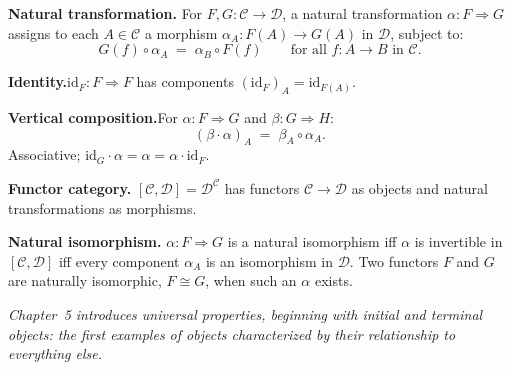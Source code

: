 \begin{formalrestatement}
\textbf{Natural transformation.}\quad
For $F, G : \mathcal{C} \to \mathcal{D}$, a natural transformation
$\alpha : F \Rightarrow G$ assigns to each $A \in \mathcal{C}$ a morphism
$\alpha_A : F(A) \to G(A)$ in $\mathcal{D}$, subject to:
\begin{equation*}
  G(f) \circ \alpha_A \;=\; \alpha_B \circ F(f)
  \qquad \text{for all } f : A \to B \text{ in } \mathcal{C}.
\end{equation*}

\medskip
\textbf{Identity.}\quad $\mathrm{id}_F : F \Rightarrow F$ has components
$(\mathrm{id}_F)_A = \mathrm{id}_{F(A)}$.

\medskip
\textbf{Vertical composition.}\quad For $\alpha : F \Rightarrow G$ and
$\beta : G \Rightarrow H$:
\begin{equation*}
  (\beta \cdot \alpha)_A \;=\; \beta_A \circ \alpha_A.
\end{equation*}
Associative; $\mathrm{id}_G \cdot \alpha = \alpha = \alpha \cdot \mathrm{id}_F$.

\medskip
\textbf{Functor category.}\quad
$[\mathcal{C}, \mathcal{D}] = \mathcal{D}^{\mathcal{C}}$ has functors
$\mathcal{C} \to \mathcal{D}$ as objects and natural transformations as
morphisms.

\medskip
\textbf{Natural isomorphism.}\quad
$\alpha : F \Rightarrow G$ is a natural isomorphism iff $\alpha$ is
invertible in $[\mathcal{C}, \mathcal{D}]$ iff every component $\alpha_A$
is an isomorphism in $\mathcal{D}$. Two functors $F$ and $G$ are naturally
isomorphic, $F \cong G$, when such an $\alpha$ exists.

\medskip
\noindent\textit{Chapter~5 introduces universal properties, beginning with
initial and terminal objects: the first examples of objects characterized
by their relationship to everything else.}
\end{formalrestatement}
